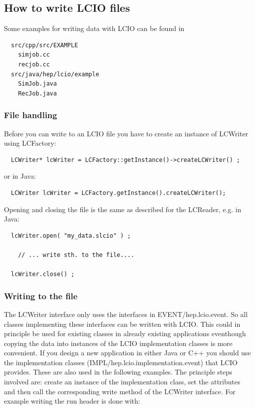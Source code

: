 \documentclass[twoside]{article}
\begin{document}
\subsection{How to write LCIO files}

Some examples for writing data with LCIO can be found in
\begin{verbatim}
  src/cpp/src/EXAMPLE
    simjob.cc
    recjob.cc
  src/java/hep/lcio/example
    SimJob.java
    RecJob.java
\end{verbatim}

\subsubsection{File handling}
Before you can write to an LCIO file you have to create an instance of LCWriter using LCFactory:

\begin{verbatim}
  LCWriter* lcWriter = LCFactory::getInstance()->createLCWriter() ;
\end{verbatim}
or in Java:
\begin{verbatim}
  LCWriter lcWriter = LCFactory.getInstance().createLCWriter();
\end{verbatim}


Opening and closing the file is the same as described for the LCReader, e.g. in Java:
\begin{verbatim}
  lcWriter.open( "my_data.slcio" ) ;

    // ... write sth. to the file....

  lcWriter.close() ;
\end{verbatim}

\subsubsection{Writing to the file}
The LCWriter interface only uses the interfaces in EVENT/hep.lcio.event. 
So all classes implementing these interfaces can be written with LCIO.
This could in principle be used for existing classes in already existing applications eventhough 
copying the data into instances of the LCIO implementation classes is more convenient.
If  you design a new application in either Java or C++ you should use the implementation
classes (IMPL/hep.lcio.implementation.event) that LCIO provides.
These are also used in the following examples. The principle steps involved are: 
create an instance of the implementation class, set the attributes and then call the corresponding
write method of the LCWriter interface.
For example writing the run header is done with:
\end{document}
